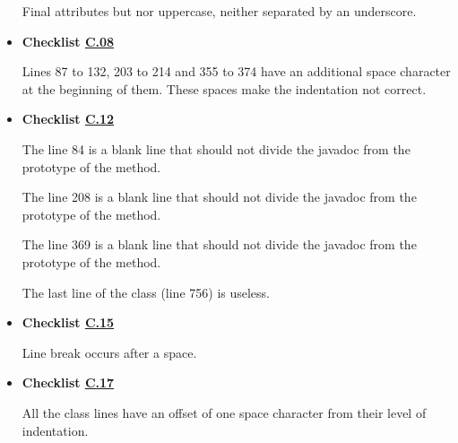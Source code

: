\documentclass[../../../../codeInspection.tex]{subfiles}
\begin{document}
\begin{itemize}
		    	  

		    	  

		    	  

		    	  Final attributes but nor uppercase, neither separated by an underscore.

		    \item \textbf{Checklist \hyperref[C:08]{C.08}}

		Lines 87 to 132, 203 to 214 and 355 to 374 have an additional space character at the beginning of them. These spaces make the indentation not correct.
		    \item \textbf{Checklist \hyperref[C:12]{C.12}}

		    	  

		    	  The line 84 is a blank line that should not divide the javadoc from the prototype of the method.

		    	  

		    	  The line 208 is a blank line that should not divide the javadoc from the prototype of the method.

		    	  

		    	  The line 369 is a blank line that should not divide the javadoc from the prototype of the method.

		    	  The last line of the class (line 756) is useless.

		    \item \textbf{Checklist \hyperref[C:15]{C.15}}

		    	  

		    	  Line break occurs after a space.

		    \item \textbf{Checklist \hyperref[C:17]{C.17}}

		    	  All the class lines have an offset of one space character from their level of indentation.


\end{itemize}
\end{document}
